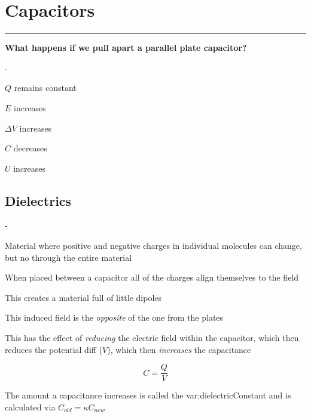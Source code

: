 \pagebreak
\section{Capacitors}
\hrule
\vspace{.5cm}
\textbf{What happens if we pull apart a parallel plate capacitor?}
\begin{list}{-}{}
\item \(Q\) remains constant
\item \(E\) increases
\item \(\Delta V\) increases 
\item \(C\) decreases 
\item \(U\) increases
\end{list}

\subsection{Dielectrics}\label{sec:dielectrics}
\begin{list}{-}{}
\item Material where positive and negative charges in individual molecules can change, but no through the entire material
\item When placed between a capacitor all of the charges align themselves to the field
\item This creates a material full of little dipoles 
\item This induced field is the \textit{opposite} of the one from the plates 
\item This has the effect of \textit{reducing} the electric field within the capacitor, which then reduces the potential diff (\(V\)), which then \textit{increases} the capacitance 
\item \[C = \frac{Q}{V}\]  
\item The amount a capacitance increases is called the \gls{var:dielectricConstant} and is calculated via \(C_{old} = \kappa C_{new}\)
\end{list}

